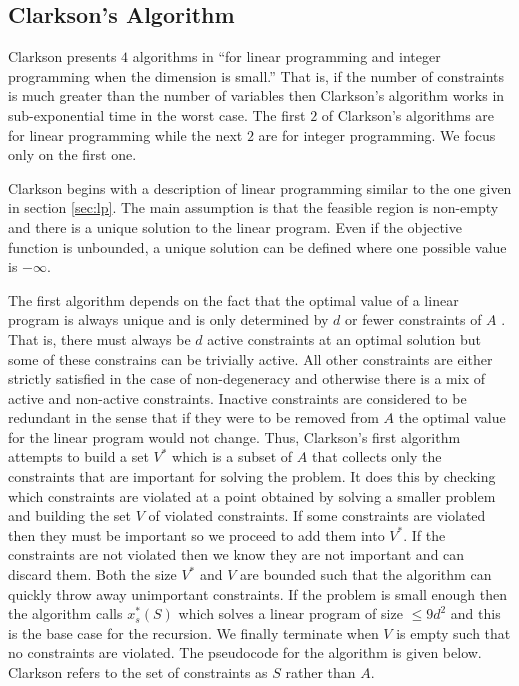 \documentclass{standalone}
\begin{document}
\subsection{Clarkson's Algorithm}
\label{sec:pivot:clarkson}
{
  Clarkson presents $4$ algorithms in \cite{clarkson1995vegas} ``for linear programming and integer programming when the dimension is small.'' That is, if the number of constraints is much greater than the number of variables then Clarkson's algorithm works in sub-exponential time in the worst case. The first $2$ of Clarkson's algorithms are for linear programming while the next $2$ are for integer programming. We focus only on the first one.\par
  Clarkson begins with a description of linear programming similar to the one given in section \ref{sec:lp}. The main assumption is that the feasible region is non-empty and there is a unique solution to the linear program. Even if the objective function is unbounded, a unique solution can be defined where one possible value is $-\infty$.\par
  The first algorithm depends on the fact that the optimal value of a linear program is always unique and is only determined by $d$ or fewer constraints of $A$ \cite{clarkson1995vegas}. That is, there must always be $d$ active constraints at an optimal solution but some of these constrains can be trivially active. All other constraints are either strictly satisfied in the case of non-degeneracy and otherwise there is a mix of active and non-active constraints. Inactive constraints are considered to be redundant in the sense that if they were to be removed from $A$ the optimal value for the linear program would not change. Thus, Clarkson's first algorithm attempts to build a set $V^{*}$ which is a subset of $A$ that collects only the constraints that are important for solving the problem. It does this by checking which constraints are violated at a point obtained by solving a smaller problem and building the set $V$ of violated constraints. If some constraints are violated then they must be important so we proceed to add them into $V^{*}$. If the constraints are not violated then we know they are not important and can discard them. Both the size $V^{*}$ and $V$ are bounded such that the algorithm can quickly throw away unimportant constraints. If the problem is small enough then the algorithm calls $x^{*}_{s}(S)$ which solves a linear program of size $\le 9d^{2}$ and this is the base case for the recursion. We finally terminate when $V$ is empty such that no constraints are violated. The pseudocode for the algorithm is given below. Clarkson refers to the set of constraints as $S$ rather than $A$.
}
\end{document}
